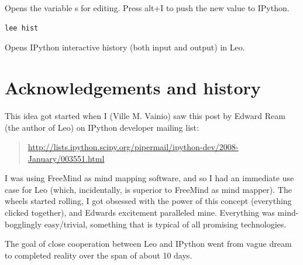 \documentclass[a4paper,10pt,english]{sphinxmanual}
\begin{document}
Opens the variable s for editing. Press alt+I to push the new value to IPython.

\begin{Verbatim}[commandchars=\\\{\}]
lee hist
\end{Verbatim}

Opens IPython interactive history (both input and output) in Leo.


\section{Acknowledgements and history}
\label{IPythonBridge:acknowledgements-and-history}
This idea got started when I (Ville M. Vainio) saw this post by Edward Ream (the author of
Leo) on IPython developer mailing list:
\begin{quote}

\href{http://lists.ipython.scipy.org/pipermail/ipython-dev/2008-January/003551.html}{http://lists.ipython.scipy.org/pipermail/ipython-dev/2008-January/003551.html}
\end{quote}

I was using FreeMind as mind mapping software, and so I had an immediate use
case for Leo (which, incidentally, is superior to FreeMind as mind mapper). The
wheels started rolling, I got obsessed with the power of this concept
(everything clicked together), and Edwards excitement paralleled mine.
Everything was mind-bogglingly easy/trivial, something that is typical of all
promising technologies.

The goal of close cooperation between Leo and IPython went from
vague dream to completed reality over the span of about 10 days.
\end{document}
